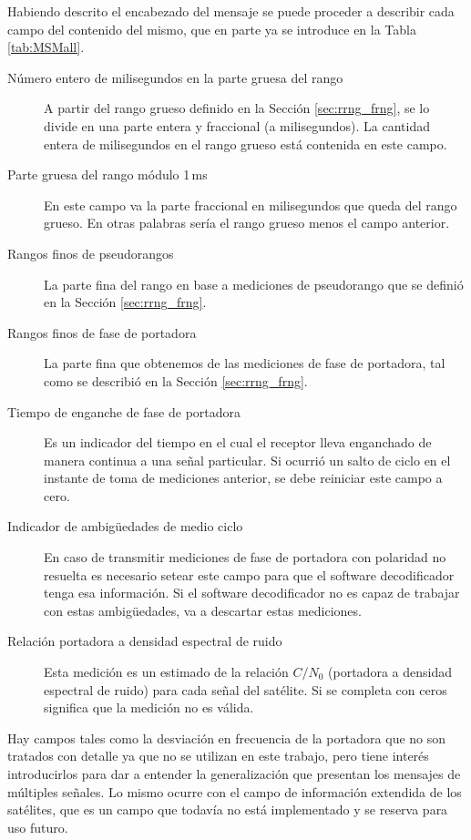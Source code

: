 \documentclass[a4paper,12pt,oneside,onecolumn,final,openright]{book}%
\begin{document}
	Habiendo descrito el encabezado del mensaje se puede proceder a describir cada campo del contenido del mismo, que en parte ya se introduce en la Tabla \ref{tab:MSMall}. 
\begin{description}
	\item[Número entero de milisegundos en la parte gruesa del rango] A partir del rango grueso definido en la Sección \ref{sec:rrng_frng}, se lo divide en una parte entera y fraccional (a milisegundos). La cantidad entera de milisegundos en el rango grueso está contenida en este campo.
	\item[Parte gruesa del rango módulo 1\,ms] En este campo va la parte fraccional en milisegundos que queda del rango grueso. En otras palabras sería el rango grueso menos el campo anterior.
	\item[Rangos finos de pseudorangos] La parte fina del rango en base a mediciones de pseudorango que se definió en la Sección \ref{sec:rrng_frng}.
	\item[Rangos finos de fase de portadora] La parte fina que obtenemos de las mediciones de fase de portadora, tal como se describió en la Sección \ref{sec:rrng_frng}.
	\item[Tiempo de enganche de fase de portadora] Es un indicador del tiempo en el cual el receptor lleva enganchado de manera continua a una señal particular. Si ocurrió un salto de ciclo en el instante de toma de mediciones anterior, se debe reiniciar este campo a cero.
	\item[Indicador de ambigüedades de medio ciclo] En caso de transmitir mediciones de fase de portadora con polaridad no resuelta es necesario setear este campo para que el software decodificador tenga esa información. Si el software decodificador no es capaz de trabajar con estas ambigüedades, va a descartar estas mediciones.
	\item[Relación portadora a densidad espectral de ruido] Esta medición es un estimado de la relación $C/N_0$ (portadora a densidad espectral de ruido) para cada señal del satélite. Si se completa con ceros significa que la medición no es válida.
\end{description}

	Hay campos tales como la desviación en frecuencia de la portadora que no son tratados con detalle ya que no se utilizan en este trabajo, pero tiene interés introducirlos para dar a entender la generalización que presentan los mensajes de múltiples señales. Lo mismo ocurre con el campo de información extendida de los satélites, que es un campo que todavía no está implementado y se reserva para uso futuro.\\
\end{document}
